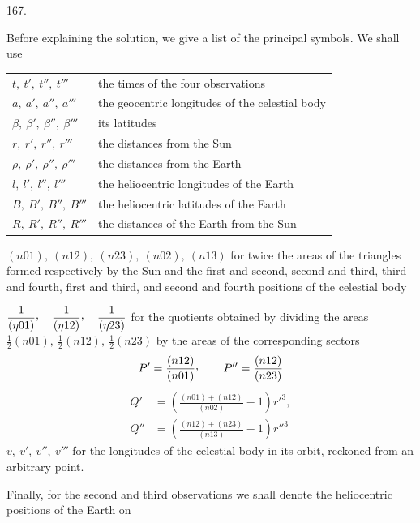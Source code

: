 \par{}\medskip
\begin{center}\hypertarget{native-230-article167}{}167.\end{center}
Before explaining the solution, we give a list of the principal symbols. We shall use
\par\noindent
\begin{tabular}{@{}ll@{}}
$t,\ t',\ t'',\ t'''$ & the times of the four observations\\
$a,\ a',\ a'',\ a'''$ & the geocentric longitudes of the celestial body\\
$\beta,\ \beta',\ \beta'',\ \beta'''$ & its latitudes\\
$r,\ r',\ r'',\ r'''$ & the distances from the Sun\\
$\rho,\ \rho',\ \rho'',\ \rho'''$ & the distances from the Earth\\
$l,\ l',\ l'',\ l'''$ & the heliocentric longitudes of the Earth\\
$B,\ B',\ B'',\ B'''$ & the heliocentric latitudes of the Earth\\
$R,\ R',\ R'',\ R'''$ & the distances of the Earth from the Sun
\end{tabular}
\par\noindent{}
$(n01),\ (n12),\ (n23),\ (n02),\ (n13)$ for twice the areas of the triangles formed respectively
by the Sun and the first and second,
second and third, third and fourth, first and third, and second and fourth positions of the celestial body
\par\noindent
$\dfrac{1}{(\eta01)}\mathpunct{\raisebox{.45ex}{,}}\quad
\dfrac{1}{(\eta12)}\mathpunct{\raisebox{.45ex}{,}}\quad
\dfrac{1}{(\eta23)}$ for the quotients obtained by dividing the areas
\newline
$\frac12(n01),\ \frac12(n12),\ \frac12(n23)$
by the areas of the corresponding sectors
\[
P'=\frac{(n12)}{(n01)}\mathpunct{\raisebox{.45ex}{,}}\qquad
P''=\frac{(n12)}{(n23)}
\]
\[
\begin{aligned}
Q'&=\left(\frac{(n01)+(n12)}{(n02)}-1\right)r'^3,\\[.5em]
Q''&=\left(\frac{(n12)+(n23)}{(n13)}-1\right)r''^3
\end{aligned}
\]
\noindent $v,\ v',\ v'',\ v'''$ for the longitudes of the celestial body in its orbit, reckoned from an arbitrary point.
\par
Finally, for the second and third observations we shall denote the heliocentric positions of the Earth on
